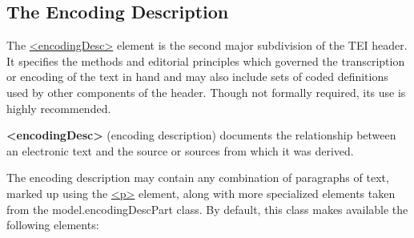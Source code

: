 \subsection[{The Encoding Description}]{The Encoding Description}\label{HD5}\par
The \hyperref[TEI.encodingDesc]{<encodingDesc>} element is the second major subdivision of the TEI header. It specifies the methods and editorial principles which governed the transcription or encoding of the text in hand and may also include sets of coded definitions used by other components of the header. Though not formally required, its use is highly recommended. 
\begin{sansreflist}
  
\item [\textbf{<encodingDesc>}] (encoding description) documents the relationship between an electronic text and the source or sources from which it was derived.
\end{sansreflist}
 The encoding description may contain any combination of paragraphs of text, marked up using the \hyperref[TEI.p]{<p>} element, along with more specialized elements taken from the \textsf{model.encodingDescPart} class. By default, this class makes available the following elements: 
